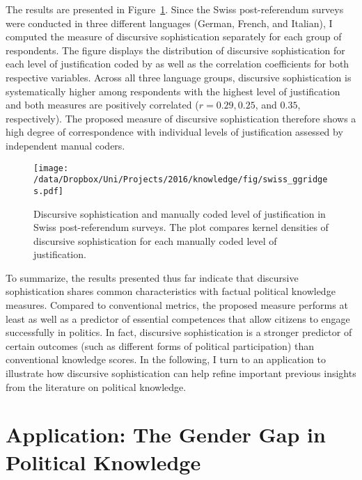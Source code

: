 The results are presented in Figure~\ref{fig:swiss_ggridges}. Since the Swiss post-referendum surveys were conducted in three different languages (German, French, and Italian), I computed the measure of discursive sophistication separately for each group of respondents. The figure displays the distribution of discursive sophistication for each level of justification coded by \citet{colombo2016justifications} as well as the correlation coefficients for both respective variables. Across all three language groups, discursive sophistication is systematically higher among respondents with the highest level of justification and both measures are positively correlated ($r=0.29, 0.25$, and $0.35$, respectively). The proposed measure of discursive sophistication therefore shows a high degree of correspondence with individual levels of justification assessed by independent manual coders.

\begin{figure}[h]\centering
\texttt{[image: /data/Dropbox/Uni/Projects/2016/knowledge/fig/swiss\_ggridges.pdf]}
\caption[Discursive sophistication and manually coded level of justification in Swiss post-referendum surveys]{Discursive sophistication and manually coded level of justification \citep{colombo2016justifications} in Swiss post-referendum surveys. The plot compares kernel densities of discursive sophistication for each manually coded level of justification.}\label{fig:swiss_ggridges}
\end{figure}

To summarize, the results presented thus far indicate that discursive sophistication shares common characteristics with factual political knowledge measures. Compared to conventional metrics, the proposed measure performs at least as well as a predictor of essential competences that allow citizens to engage successfully in politics. In fact, discursive sophistication is a stronger predictor of certain outcomes (such as different forms of political participation) than conventional knowledge scores. In the following, I turn to an application to illustrate how discursive sophistication can help refine important previous insights from the literature on political knowledge.

\section*{Application: The Gender Gap in Political Knowledge}

